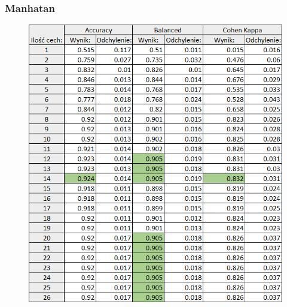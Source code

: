 \documentclass[12pt]{article}
\begin{document}
\subsubsection{Manhatan}
\begin{figure}[H]
	\centering
		\includegraphics[scale=0.9]{images/metrics/9nn_manhatan_norm_tab.png}
	\label{metryki_manhatan_norm_tab}
\end{figure}
\end{document}
